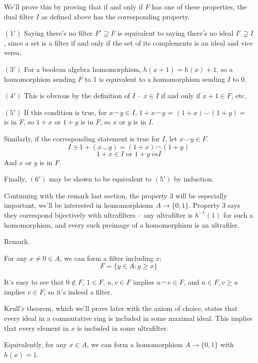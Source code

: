 \documentclass{article}
\begin{document}
      We'll prove this by proving that if and only if $F$ has one of these
      properties, the dual filter $I$ as defined above has the corresponding
      property.

      $(1')$ Saying there's no filter $F' \supsetneq F$ is equivalent to saying
      there's no ideal $I' \supsetneq I$, since a set is a filter if and only if
      the set of its complements is an ideal and vice versa.

      $(3')$ For a boolean algebra homomorphism, $h(x+1) = h(x) + 1$, so a
      homomorphism sending $F$ to 1 is equivalent to a homomorphism sending $I$
      to 0.

      $(4')$ This is obvious by the definition of $I$ -- $x \in I$ if and only
      if $x+1 \in F$, etc.

      $(5')$ If this condition is true, for $x \frown y \in I$, $1+ x \frown y$
      = $(1+x) \smile (1+y) = $ is in $F$, so $1+x$ or $1+y$ is in $F$, so $x$
      or $y$ is in $I$.

      Similarly, if the corresponding statement is true for $I$, let $x \smile y
      \in F$.
      \[I \ni 1 + (x \smile y) = (1 + x) \frown (1 + y)\]
      \[1 + x \in I \text{ or } 1 + y \ in I\]
      And $x$ or $y$ is in $F$.

      Finally, $(6')$ may be shown to be equivalent to $(5')$ by induction.

      Continuing with the remark last section, the property $3$ will be
      especially important, we'll be interested in homomorphisms $A \to
      \{0,1\}$. Property 3 says they correspond bijectively with ultrafilters --
      any ultrafilter is $h^{-1}(1)$ for such a homomorphism, and every such
      preimage of a homomorphism is an ultrafiler.

      Remark.

      For any $x \neq 0 \in A$, we can form a filter including $x$:
      \[ F = \{y \in A: y \geq x\}\]

      It's easy to see that $0 \notin F$, $1 \in F$, $u, v \in F$ implies $u
      \frown v \in F$, and $u \in F, v \geq u$ implies $v \in F$, so it's indeed
      a filter.

      Krull's theorem, which we'll prove later with the axiom of choice, states
      that every ideal in a commutative ring is included in some maximal ideal.
      This implies that every element in $x$ is included in some ultrafilter.

      Equivalently, for any $x \in A$, we can form a homomorphism $A
      \rightarrow \{0,1\}$ with $h(x)=1$.
\end{document}
